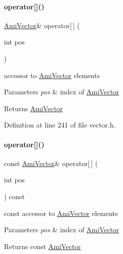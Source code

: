 \paragraph{\texorpdfstring{operator[]()}{operator[]()}\hspace{0.1cm}{\footnotesize\ttfamily [1/2]}}
{\footnotesize\ttfamily \mbox{\hyperlink{classamici_1_1_ami_vector}{Ami\+Vector}}\& operator\mbox{[}$\,$\mbox{]} (\begin{DoxyParamCaption}\item[{int}]{pos }\end{DoxyParamCaption})}

accessor to \mbox{\hyperlink{classamici_1_1_ami_vector}{Ami\+Vector}} elements 
\begin{DoxyParams}{Parameters}
{\em pos} & index of \mbox{\hyperlink{classamici_1_1_ami_vector}{Ami\+Vector}} \\
\hline
\end{DoxyParams}
\begin{DoxyReturn}{Returns}
\mbox{\hyperlink{classamici_1_1_ami_vector}{Ami\+Vector}} 
\end{DoxyReturn}


Definition at line 241 of file vector.\+h.

\mbox{\label{classamici_1_1_ami_vector_array_a45a615cf5e4b550783ee23560c834941}} 
\paragraph{\texorpdfstring{operator[]()}{operator[]()}\hspace{0.1cm}{\footnotesize\ttfamily [2/2]}}
{\footnotesize\ttfamily const \mbox{\hyperlink{classamici_1_1_ami_vector}{Ami\+Vector}}\& operator\mbox{[}$\,$\mbox{]} (\begin{DoxyParamCaption}\item[{int}]{pos }\end{DoxyParamCaption}) const}

const accessor to \mbox{\hyperlink{classamici_1_1_ami_vector}{Ami\+Vector}} elements 
\begin{DoxyParams}{Parameters}
{\em pos} & index of \mbox{\hyperlink{classamici_1_1_ami_vector}{Ami\+Vector}} \\
\hline
\end{DoxyParams}
\begin{DoxyReturn}{Returns}
const \mbox{\hyperlink{classamici_1_1_ami_vector}{Ami\+Vector}} 
\end{DoxyReturn}


